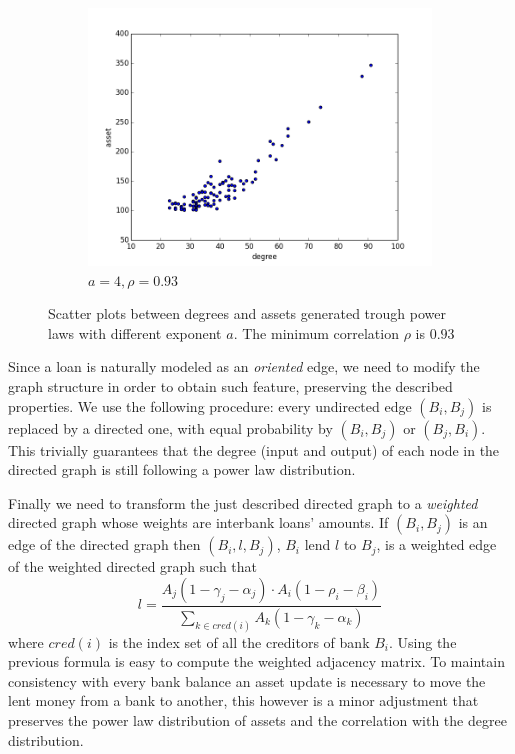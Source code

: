 \documentclass[a4paper, 11pt]{article}
\begin{document}
\begin{figure}[htbp]
\begin{subfigure}[b]{0.6\textwidth}
		\includegraphics[width=\textwidth]{images/scatter4.png}
        \caption{$a = 4, \rho = 0.93$}
	\end{subfigure}
	\caption{Scatter plots between degrees and assets generated trough power laws with different exponent $a$. The minimum correlation $\rho$ is $0.93$}\label{fig:corr}
\end{figure}

Since a loan is naturally modeled as an \emph{oriented} edge, we need to modify the graph structure in order to obtain such feature, preserving the described properties. We use the following procedure: every undirected edge $(B_i, B_j)$ is replaced by a directed one, with equal probability by $(B_i,B_j)$ or $(B_j,B_i)$. This trivially guarantees that the degree (input and output) of each node in the directed graph is still following a power law distribution.

Finally we need to transform the just described directed graph to a \emph{weighted} directed graph whose weights are interbank loans' amounts. If $(B_i,B_j)$ is an edge of the directed graph then $(B_i,l,B_j)$, $B_i$ lend $l$ to $B_j$, is a weighted edge of the weighted directed graph such that 
$$l = \frac{A_j(1-\gamma_j-\alpha_j) \cdot A_i(1-\rho_i-\beta_i)}{\sum_{k \in cred(i)} A_k(1-\gamma_k-\alpha_k)}$$
where $cred(i)$ is the index set of all the creditors of bank $B_i$. Using the previous formula is easy to compute the weighted adjacency matrix. To maintain consistency with every bank balance an asset update is necessary to move the lent money from a bank to another, this however is a minor adjustment that preserves the power law distribution of assets and the correlation with the degree distribution.
\end{document}
